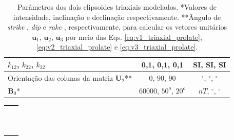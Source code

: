 \begin{table}[h!]
\begin{center}
\begin{tabular}{|l|c|c|}
			\hline
			$k_12$, $k_22$, $k_32$   & 0,1, 0,1, 0,1  & SI, SI, SI\\
			\hline
			Orientação das colunas da matriz $\mathbf{U}_2$**   & $0$, $90$, $90$  & $^{\circ}$, $^{\circ}$, $^{\circ}$\\
			\hline
			$\mathbf{B}_{0}$*    & 60000, $50^o$, $20^o$ & $nT$, $^{\circ}$, $^{\circ}$\\
			\hline			
		\end{tabular}
		\caption{Parâmetros dos  dois elipsoides triaxiais modelados. *Valores de intensidade, inclinação e declinação respectivamente. **Ângulo de \textit{strike} , \textit{dip}  e \textit{rake} , respectivamente, para calcular os vetores unitários $\mathbf{u}_{1}$, $\mathbf{u}_{2}$, $\mathbf{u}_{3}$ por meio das Eqs. \ref{eq:v1_triaxial_prolate}, \ref{eq:v2_triaxial_prolate} e \ref{eq:v3_triaxial_prolate}.}
	\end{center}
	\label{tab:ellipsoid_triaxial_multi}
\end{table}

\begin{table}[h!]
	\begin{center}
		\begin{tabular}{lc}
			
			&  \\
			& \\
			& \\
			& \\
			& \\
			& \\ 
			& \\
			& \\
				& \\
				& \\ 
				& \\
		\end{tabular}
	\end{center}
\end{table}

